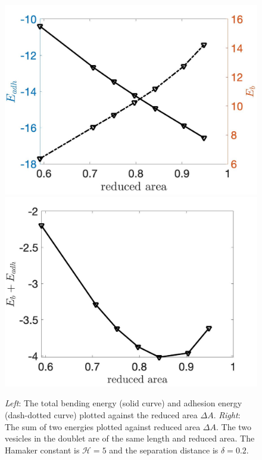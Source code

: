 \documentclass[prf,superscriptaddress,showkeys]{revtex4-1}
\begin{document}
\begin{figure}
\includegraphics[keepaspectratio=true,scale=0.175]{figs/Dec18_Ebleft_Eadhright_vs_rA_adR0p2_adS502.jpeg}
\includegraphics[keepaspectratio=true,scale=0.175]{figs/Dec18_EbEadh_vs_rA_adR0p2_adS502.jpeg}
  \caption{\label{fig:Dec18_vesicle_equilibrium1}   {\em Left}: The
  total bending energy (solid curve) and adhesion energy (dash-dotted
  curve) plotted against the reduced area $\Delta A$. {\em Right}: The
  sum of two energies plotted against reduced area $\Delta A$. The two
  vesicles in the doublet are of the same length and reduced area.  The
  Hamaker constant is $\mathcal{H} = 5$ and the separation distance is
  $\delta = 0.2$.}
\end{figure}
\end{document}
